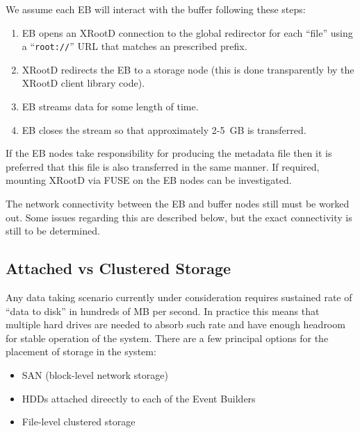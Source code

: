 \documentclass[pdftex,12pt,letter]{article}
\newcommand{\xrd}{XRootD\xspace}
\begin{document}
We assume each EB will interact with the buffer following these steps:

\begin{enumerate}
\item EB opens an \xrd connection to the global redirector for each ``file'' using a ``\texttt{root://}'' URL that matches an prescribed prefix.
\item \xrd redirects the EB to a storage node (this is done transparently by the \xrd client library code).
\item EB streams data for some length of time.
\item EB closes the stream so that approximately 2-5~GB is transferred.
\end{enumerate}

If the EB nodes take responsibility for producing the metadata file
then it is preferred that this file is also transferred in the same
manner.  If required, mounting \xrd via FUSE on the EB nodes can be
investigated.

The network connectivity between the EB and buffer nodes still must be
worked out.  Some issues regarding this are described below, but the
exact connectivity is still to be determined.


\subsection{Attached vs Clustered Storage}
Any data taking scenario currently under consideration requires sustained rate
of ``data to disk'' in hundreds of MB per second. In practice this means that
multiple hard drives are needed to absorb such rate and have enough headroom
for stable operation of the system.
There are a few principal options for the placement of storage in the system:
\begin{itemize}
\item SAN (block-level network storage)
\item HDDs attached direectly to each of the Event Builders
\item File-level clustered storage
\end{itemize}
\end{document}
